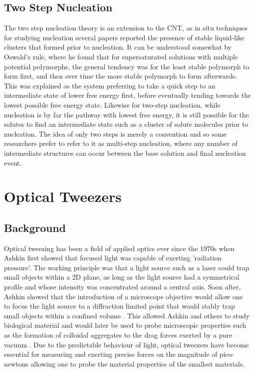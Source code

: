 \subsection{Two Step Nucleation}
The two step nucleation theory is an extension to the CNT, as in situ techniques for studying nucleation several papers reported the presence of stable liquid-like clusters that formed prior to nucleation.  It can be understood somewhat by Oswald's rule, where he found that for supersaturated solutions with multiple potential polymorphs, the general tendency was for the least stable polymorph to form first, and then over time the more stable polymorph to form afterwards. This was explained as the system preferring to take a quick step to an intermediate state of lower free energy first, before eventually tending towards the lowest possible free energy state. Likewise for two-step nucleation, while nucleation is by far the pathway with lowest free energy, it is still possible for the solutes to find an intermediate state such as a cluster of solute molecules prior to nucleation. The idea of only two steps is merely a convention and so some researchers prefer to refer to it as multi-step nucleation, where any number of intermediate structures can occur between the base solution and final nucleation event.  

\section{Optical Tweezers}
\subsection{Background}
Optical tweezing has been a field of applied optics ever since the 1970s when Ashkin \cite{Ashkin1970} first showed that focused light was capable of exerting 'radiation pressure'. The working principle was that a light source such as a laser could trap small objects within a 2D plane, as long as the light source had a symmetrical profile and whose intensity was concentrated around a central axis. Soon after, Ashkin showed that the introduction of a microscope objective would allow one to focus the light source to a diffraction limited point that would stably trap small objects within a confined volume \cite{Ashkin1980}. This allowed Ashkin and others to study biological material and would later be used to probe microscopic properties such as the formation of colloidal aggregates \cite{Yi2021} to the drag forces exerted by a pure vacuum \cite{Ahn2018, Monteiro2018}. Due to the predictable behaviour of light, optical tweezers have become essential for measuring and exerting precise forces on the magnitude of pico-newtons allowing one to probe the material properties of the smallest materials. 

